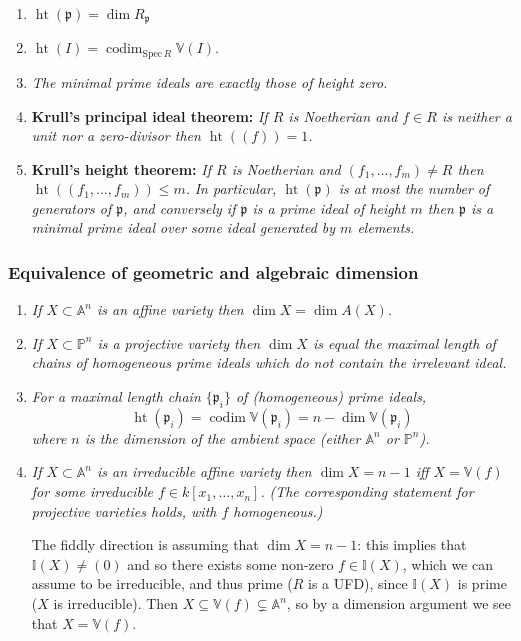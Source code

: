 \documentclass[10pt]{article}
\newcommand{\van}{\mathbb{V}}
\newcommand{\ide}{\mathbb{I}}
\newcommand{\aff}{\mathbb{A}}
\newcommand{\kon}{{k[x_1,\ldots,x_n]}}
\newcommand{\pee}{\mathbb{P}}
\newcommand{\prid}{\mathfrak{p}}
\DeclareMathOperator{\codim}{codim}
\DeclareMathOperator{\height}{ht}
\begin{document}
                \begin{enumerate}
                    \item $\height(\prid)=\dim R_\prid$
                    \item $\height(I)=\codim_{\mathrm{Spec}\,R}\van(I)$.
                    \item \emph{The minimal prime ideals are exactly those of height zero.}
                    \item \textbf{Krull's principal ideal theorem:} \emph{If $R$ is Noetherian and $f\in R$ is neither a unit nor a zero-divisor then $\height((f))=1$.}
                    \item \textbf{Krull's height theorem:} \emph{If $R$ is Noetherian and $(f_1,\ldots,f_m)\neq R$ then $\height((f_1,\ldots,f_m))\leqslant m$.}
                        \emph{In particular, $\height(\prid)$ is \emph{at most} the number of generators of $\prid$, and conversely if $\prid$ is a prime ideal of height $m$ then $\prid$ is a minimal prime ideal over some ideal generated by $m$ elements.}
                \end{enumerate}

            \subsubsection{Equivalence of geometric and algebraic dimension}

                \begin{enumerate}
                    \item \emph{If $X\subset\aff^n$ is an affine variety then $\dim X=\dim A(X)$.}
                    \item \emph{If $X\subset\pee^n$ is a projective variety then $\dim X$ is equal the maximal length of chains of \emph{homogeneous} prime ideals which do \emph{not} contain the irrelevant ideal.}
                    \item \emph{For a maximal length chain $\{\prid_i\}$ of (homogeneous) prime ideals,}
                        \begin{equation*}
                            \height(\prid_i)=\codim\van(\prid_i)=n-\dim\van(\prid_i)
                        \end{equation*}
                        \emph{where $n$ is the dimension of the ambient space (either $\aff^n$ or $\pee^n$).}
                    \item \emph{If $X\subset\aff^n$ is an irreducible affine variety then $\dim X=n-1$ iff $X=\van(f)$ for some irreducible $f\in\kon$.}
                        \emph{(The corresponding statement for projective varieties holds, with $f$ homogeneous.)}

                        The fiddly direction is assuming that $\dim X=n-1$: this implies that $\ide(X)\neq(0)$ and so there exists some non-zero $f\in\ide(X)$, which we can assume to be irreducible, and thus prime ($R$ is a UFD), since $\ide(X)$ is prime ($X$ is irreducible).
                        Then $X\subseteq\van(f)\subsetneq\aff^n$, so by a dimension argument we see that $X=\van(f)$.
                \end{enumerate}
\end{document}
